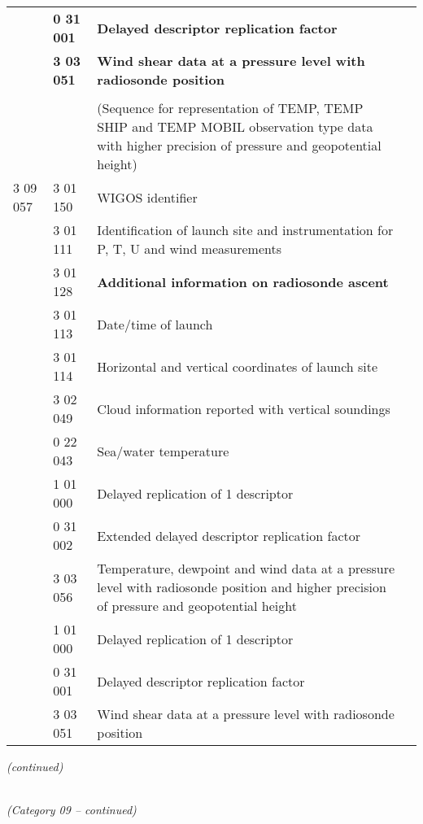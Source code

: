 \begin{longtable}[]{@{}llll@{}}
& \textbf{0 31 001} & \textbf{Delayed descriptor replication factor} &\tabularnewline
& \textbf{3 03 051} & \textbf{Wind shear data at a pressure level with radiosonde position} &\tabularnewline
& & &\tabularnewline
& & (Sequence for representation of TEMP, TEMP SHIP and TEMP MOBIL observation type data with higher precision of pressure and geopotential height) &\tabularnewline
3 09 057 & 3 01 150 & WIGOS identifier &\tabularnewline
& 3 01 111 & Identification of launch site and instrumentation for P, T, U and wind measurements &\tabularnewline
& 3 01 128 & \textbf{Additional information on radiosonde ascent} &\tabularnewline
& 3 01 113 & Date/time of launch &\tabularnewline
& 3 01 114 & Horizontal and vertical coordinates of launch site &\tabularnewline
& 3 02 049 & Cloud information reported with vertical soundings &\tabularnewline
& 0 22 043 & Sea/water temperature &\tabularnewline
& 1 01 000 & Delayed replication of 1 descriptor &\tabularnewline
& 0 31 002 & Extended delayed descriptor replication factor &\tabularnewline
& 3 03 056 & Temperature, dewpoint and wind data at a pressure level with radiosonde position and higher precision of pressure and geopotential height &\tabularnewline
& 1 01 000 & Delayed replication of 1 descriptor &\tabularnewline
& 0 31 001 & Delayed descriptor replication factor &\tabularnewline
& 3 03 051 & Wind shear data at a pressure level with radiosonde position &\tabularnewline
\bottomrule
\end{longtable}

\emph{(continued)}

\emph{\\
(Category 09 -- continued)}

